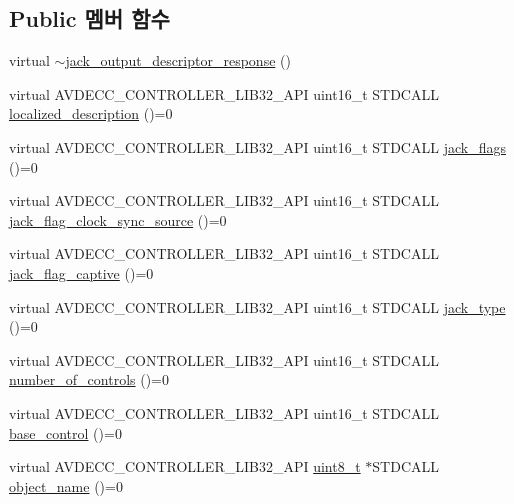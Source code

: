 \subsection*{Public 멤버 함수}
\begin{DoxyCompactItemize}
\item 
virtual \hyperlink{classavdecc__lib_1_1jack__output__descriptor__response_a39712e9554d3da162f10529a5e43b942}{$\sim$jack\+\_\+output\+\_\+descriptor\+\_\+response} ()
\item 
virtual A\+V\+D\+E\+C\+C\+\_\+\+C\+O\+N\+T\+R\+O\+L\+L\+E\+R\+\_\+\+L\+I\+B32\+\_\+\+A\+PI uint16\+\_\+t S\+T\+D\+C\+A\+LL \hyperlink{classavdecc__lib_1_1jack__output__descriptor__response_a1fb9de45567df344090a1407aa6b775f}{localized\+\_\+description} ()=0
\item 
virtual A\+V\+D\+E\+C\+C\+\_\+\+C\+O\+N\+T\+R\+O\+L\+L\+E\+R\+\_\+\+L\+I\+B32\+\_\+\+A\+PI uint16\+\_\+t S\+T\+D\+C\+A\+LL \hyperlink{classavdecc__lib_1_1jack__output__descriptor__response_ac61cbd97402a059269b432ee38c188a7}{jack\+\_\+flags} ()=0
\item 
virtual A\+V\+D\+E\+C\+C\+\_\+\+C\+O\+N\+T\+R\+O\+L\+L\+E\+R\+\_\+\+L\+I\+B32\+\_\+\+A\+PI uint16\+\_\+t S\+T\+D\+C\+A\+LL \hyperlink{classavdecc__lib_1_1jack__output__descriptor__response_a40688abe228ad246a130e82cc139c502}{jack\+\_\+flag\+\_\+clock\+\_\+sync\+\_\+source} ()=0
\item 
virtual A\+V\+D\+E\+C\+C\+\_\+\+C\+O\+N\+T\+R\+O\+L\+L\+E\+R\+\_\+\+L\+I\+B32\+\_\+\+A\+PI uint16\+\_\+t S\+T\+D\+C\+A\+LL \hyperlink{classavdecc__lib_1_1jack__output__descriptor__response_a9e30c02247953047ebc30d96d984a56a}{jack\+\_\+flag\+\_\+captive} ()=0
\item 
virtual A\+V\+D\+E\+C\+C\+\_\+\+C\+O\+N\+T\+R\+O\+L\+L\+E\+R\+\_\+\+L\+I\+B32\+\_\+\+A\+PI uint16\+\_\+t S\+T\+D\+C\+A\+LL \hyperlink{classavdecc__lib_1_1jack__output__descriptor__response_a045cc9fc7e74c9040e9e311485691d22}{jack\+\_\+type} ()=0
\item 
virtual A\+V\+D\+E\+C\+C\+\_\+\+C\+O\+N\+T\+R\+O\+L\+L\+E\+R\+\_\+\+L\+I\+B32\+\_\+\+A\+PI uint16\+\_\+t S\+T\+D\+C\+A\+LL \hyperlink{classavdecc__lib_1_1jack__output__descriptor__response_a5accf7abc7d231a0767ad5cac68b8b39}{number\+\_\+of\+\_\+controls} ()=0
\item 
virtual A\+V\+D\+E\+C\+C\+\_\+\+C\+O\+N\+T\+R\+O\+L\+L\+E\+R\+\_\+\+L\+I\+B32\+\_\+\+A\+PI uint16\+\_\+t S\+T\+D\+C\+A\+LL \hyperlink{classavdecc__lib_1_1jack__output__descriptor__response_ac1f5297533142234c764e84c01ce5a16}{base\+\_\+control} ()=0
\item 
virtual A\+V\+D\+E\+C\+C\+\_\+\+C\+O\+N\+T\+R\+O\+L\+L\+E\+R\+\_\+\+L\+I\+B32\+\_\+\+A\+PI \hyperlink{stdint_8h_aba7bc1797add20fe3efdf37ced1182c5}{uint8\+\_\+t} $\ast$S\+T\+D\+C\+A\+LL \hyperlink{classavdecc__lib_1_1descriptor__response__base_a133f7774946d80f82b8aaaa4cfbb7361}{object\+\_\+name} ()=0
\end{DoxyCompactItemize}


